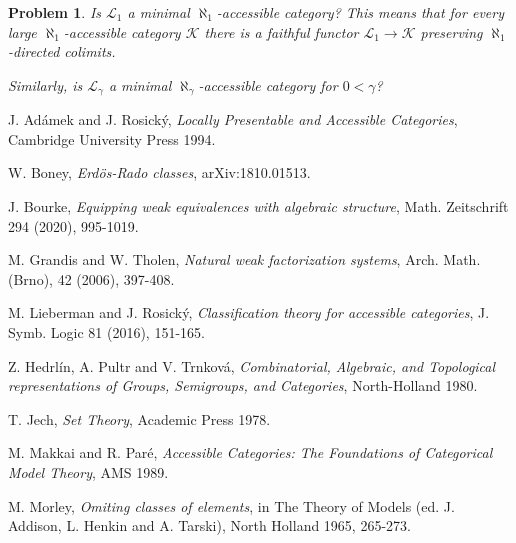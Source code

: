 \documentclass[12pt]{amsart}
\newtheorem{pb}[theo]{Problem}
\newcommand\ck{\mathcal {K}}
\newcommand\cl{\mathcal {L}}
\begin{document}
\begin{pb}
{
\em
Is $\cl_1$ a minimal $\aleph_1$-accessible category? This means that for every large $\aleph_1$-accessible category $\ck$ there is a faithful functor $\cl_1\to\ck$ preserving $\aleph_1$-directed colimits.

Similarly, is $\cl_\gamma$ a minimal $\aleph_\gamma$-accessible category
for $0<\gamma$?
}
\end{pb}

 

\begin{thebibliography}{EAPT}
\itemsep=2pt
 
 J. Ad\'{a}mek and J. Rosick\'{y}, {\em Locally Presentable and Accessible Categories}, Cambridge University
Press 1994.


 W. Boney, {\em Erd\"os-Rado classes}, arXiv:1810.01513.

 J. Bourke, {\em Equipping weak equivalences with algebraic structure}, Math. Zeitschrift 294 (2020), 995-1019.

 M. Grandis and W. Tholen, {\em Natural weak factorization systems}, Arch. Math. (Brno), 42 (2006), 397-408.



 M. Lieberman and J. Rosick\'y, {\em Classification theory for accessible categories}, J.  Symb. Logic 81 (2016), 151-165.
 
 Z. Hedrl\'in, A. Pultr and V. Trnkov\'a, {\em Combinatorial, Algebraic, and Topological representations of Groups, Semigroups, and Categories}, North-Holland 1980.
 
 T. Jech, {\em Set Theory}, Academic Press 1978.
 
 M. Makkai and R. Par\' e, {\em Accessible Categories: The Foundations of Categorical Model Theory}, AMS 1989.

 M. Morley, {\em Omiting classes of elements}, in The Theory of Models (ed. J. Addison, L. Henkin and A. Tarski),
North Holland 1965, 265-273.


\end{thebibliography}
\end{document}
